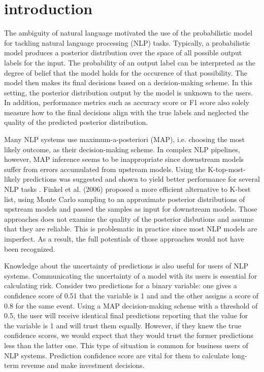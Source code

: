 \chapter{introduction}
\doublespacenormalsize
The ambiguity of natural language motivated the use of the probabilistic model for tackling natural language processing (NLP) tasks. Typically, a probabilistic model produces a posterior distribution over the space of all possible output labels for the input. The probability of an output label can be interpreted as the degree of belief that the model holds for the occurence of that possibility. The model then makes its final decisions based on a decision-making scheme. In this setting, the posterior distribution output by the model is unknown to the users. In addition, performance metrics such as accuracy score or F1 score also solely measure how to the final decisions align with the true labels and neglected the quality of the predicted posterior distribution. 

Many NLP systems use maximum-a-posteriori (MAP), i.e. choosing the most likely outcome, as their decision-making scheme. In complex NLP pipelines, however, MAP inference seems to be inappropriate since downstream models suffer from errors accumulated from upstream models. Using the K-top-most-likely predictions was suggested and shown to yield better performance for several NLP tasks \citep{sutton2005joint, wellner2004integrated}. Finkel et al. (2006) proposed a more efficient alternative to K-best list, using Monte Carlo sampling to an approximate posterior distributions of upstream models and passed the samples as input for downstream models. Those approaches does not examine the quality of the posterior disbutions and assume that they are reliable. This is problematic in practice since most NLP models are imperfect. As a result, the full potentials of those approaches would not have been recognized. 

Knowledge about the uncertainty of predictions is also useful for users of NLP systems. Communicating the uncertainty of a model with its users is essential for calculating risk. Consider two predictions for a binary variable: one gives a confidence score of 0.51 that the variable is 1 and and the other assigns a score of 0.8 for the same event. Using a MAP decision-making scheme with a threshold of 0.5, the user will receive identical final predictions reporting that the value for the variable is 1 and will trust them equally. However, if they knew the true confidence scores, we would expect that they would trust the former predictions less than the latter one. This type of situation is common for business users of NLP systems. Prediction confidence score are vital for them to calculate long-term revenue and make investment decisions.

